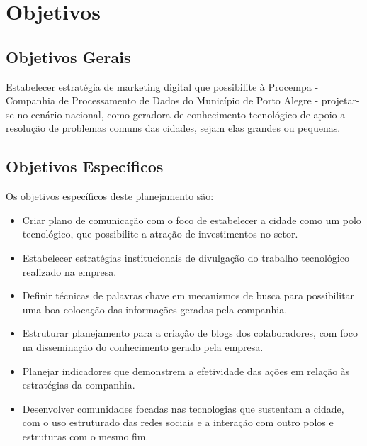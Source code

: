 \chapter{Objetivos}
\section{Objetivos Gerais}
Estabelecer estratégia de marketing digital que possibilite à Procempa - Companhia de Processamento de Dados do Município de Porto Alegre - projetar-se no cenário nacional, como geradora de conhecimento tecnológico de apoio a resolução de problemas comuns das cidades, sejam elas grandes ou pequenas.

\section{Objetivos Específicos}
Os objetivos específicos deste planejamento são:
\begin{itemize}
\item Criar plano de comunicação com o foco de estabelecer a cidade como um polo tecnológico, que possibilite a atração de investimentos no setor.
\item Estabelecer estratégias institucionais de divulgação do trabalho tecnológico realizado na empresa.
\item Definir técnicas de palavras chave em mecanismos de busca para possibilitar uma boa colocação das informações geradas pela companhia.
\item Estruturar planejamento para a criação de blogs dos colaboradores, com foco na disseminação do conhecimento gerado pela empresa.
\item Planejar indicadores que demonstrem a efetividade das ações em relação às estratégias da companhia.
\item Desenvolver comunidades focadas nas tecnologias que sustentam a cidade, com o uso estruturado das redes sociais e a interação com outro polos e estruturas com o mesmo fim.
\end{itemize}
